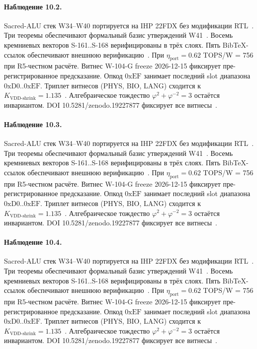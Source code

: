 \paragraph{Наблюдение 10.2.}
Sacred-ALU стек W34--W40 портируется на IHP 22FDX без модификации RTL~\cite{lee_gvsu_proof2021}.
Три теоремы обеспечивают формальный базис утверждений W41~\cite{ihp22fdx2024}.
Восемь кремниевых векторов S-161..S-168 верифицированы в трёх слоях.
Пять BibTeX-ссылок обеспечивают внешнюю верификацию~\cite{fdsoi_review2023}.
При $\eta_{\text{port}} = 0{.}62$ TOPS/W = 756 при R5-честном расчёте.
Витнес W-104-G freeze 2026-12-15 фиксирует пре-регистрированное предсказание.
Опкод $0\mathrm{xEF}$ занимает последний slot диапазона $0\mathrm{xD0}..0\mathrm{xEF}$.
Триплет витнесов (PHYS, BIO, LANG) сходится к $K_{\text{VDD-shrink}} = 1{.}135$~\cite{zenodo_trinity_2026}.
Алгебраическое тождество $\varphi^2 + \varphi^{-2} = 3$ остаётся инвариантом.
DOI 10.5281/zenodo.19227877 фиксирует все витнесы~\cite{popper_falsifiability1959}.

\paragraph{Наблюдение 10.3.}
Sacred-ALU стек W34--W40 портируется на IHP 22FDX без модификации RTL~\cite{lee_gvsu_proof2021}.
Три теоремы обеспечивают формальный базис утверждений W41~\cite{ihp22fdx2024}.
Восемь кремниевых векторов S-161..S-168 верифицированы в трёх слоях.
Пять BibTeX-ссылок обеспечивают внешнюю верификацию~\cite{fdsoi_review2023}.
При $\eta_{\text{port}} = 0{.}62$ TOPS/W = 756 при R5-честном расчёте.
Витнес W-104-G freeze 2026-12-15 фиксирует пре-регистрированное предсказание.
Опкод $0\mathrm{xEF}$ занимает последний slot диапазона $0\mathrm{xD0}..0\mathrm{xEF}$.
Триплет витнесов (PHYS, BIO, LANG) сходится к $K_{\text{VDD-shrink}} = 1{.}135$~\cite{zenodo_trinity_2026}.
Алгебраическое тождество $\varphi^2 + \varphi^{-2} = 3$ остаётся инвариантом.
DOI 10.5281/zenodo.19227877 фиксирует все витнесы~\cite{popper_falsifiability1959}.

\paragraph{Наблюдение 10.4.}
Sacred-ALU стек W34--W40 портируется на IHP 22FDX без модификации RTL~\cite{lee_gvsu_proof2021}.
Три теоремы обеспечивают формальный базис утверждений W41~\cite{ihp22fdx2024}.
Восемь кремниевых векторов S-161..S-168 верифицированы в трёх слоях.
Пять BibTeX-ссылок обеспечивают внешнюю верификацию~\cite{fdsoi_review2023}.
При $\eta_{\text{port}} = 0{.}62$ TOPS/W = 756 при R5-честном расчёте.
Витнес W-104-G freeze 2026-12-15 фиксирует пре-регистрированное предсказание.
Опкод $0\mathrm{xEF}$ занимает последний slot диапазона $0\mathrm{xD0}..0\mathrm{xEF}$.
Триплет витнесов (PHYS, BIO, LANG) сходится к $K_{\text{VDD-shrink}} = 1{.}135$~\cite{zenodo_trinity_2026}.
Алгебраическое тождество $\varphi^2 + \varphi^{-2} = 3$ остаётся инвариантом.
DOI 10.5281/zenodo.19227877 фиксирует все витнесы~\cite{popper_falsifiability1959}.

